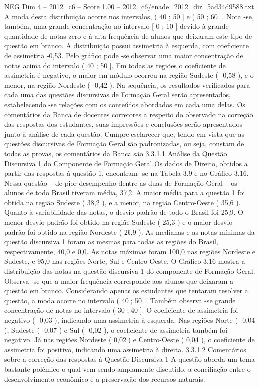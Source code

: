 \begin{textsample}{NEG Dim 4 – 2012\_c6 – Score 1.00 – 2012\_c6/enade\_2012\_dir\_5ad34d9588.txt}
A moda desta distribuição ocorre nos intervalos, ( 40 ; 50 ] e ( 50 ; 60 ].
Nota -se, também, uma grande concentração no intervalo [ 0 ; 10 ] devido à grande quantidade de notas zero e à alta frequência de alunos que deixaram este tipo de questão em branco.
A distribuição possui assimetria à esquerda, com coeficiente de assimetria -0,53.
Pelo gráfico pode -se observar uma maior concentração de notas acima do intervalo ( 40 ; 50 ].
Em todas as regiões o coeficiente de assimetria é negativo, o maior em módulo ocorreu na região Sudeste ( -0,58 ), e o menor, na região Nordeste ( -0,42 ).
Na sequência, os resultados verificados para cada uma das questões discursivas de Formação Geral serão apresentados, estabelecendo -se relações com os conteúdos abordados em cada uma delas.
Os comentários da Banca de docentes corretores a respeito do observado na correção das respostas dos estudantes, suas impressões e conclusões serão apresentados junto à análise de cada questão.
Cumpre esclarecer que, tendo em vista que as questões discursivas de Formação Geral são padronizadas, ou seja, constam de todas as provas, os comentários da Banca são 3.3.1.1 Análise da Questão Discursiva 1 do Componente de Formação Geral Os dados de Direito, obtidos a partir das respostas à questão 1, encontram -se na Tabela 3.9 e no Gráfico 3.16.
Nessa questão – de pior desempenho dentre as duas de Formação Geral – os alunos de todo Brasil tiveram média, 37,2.
A maior média para a questão 1 foi obtida na região Sudeste ( 38,2 ), e a menor, na região Centro-Oeste ( 35,6 ).
Quanto à variabilidade das notas, o desvio padrão de todo o Brasil foi 25,9.
O menor desvio padrão foi obtido na região Sudeste ( 25,3 ) e o maior desvio padrão foi obtido na região Nordeste ( 26,9 ).
As medianas e as notas mínimas da questão discursiva 1 foram as mesmas para todas as regiões do Brasil, respectivamente, 40,0 e 0,0.
As notas máximas foram 100,0 nas regiões Nordeste e Sudeste, e 95,0 nas regiões Norte, Sul e Centro-Oeste.
O Gráfico 3.16 mostra a distribuição das notas na questão discursiva 1 do componente de Formação Geral.
Observa -se que a maior frequência corresponde aos alunos que deixaram a questão em branco.
Considerando apenas os estudantes que tentaram resolver a questão, a moda ocorre no intervalo ( 40 ; 50 ].
Também observa -se grande concentração de notas no intervalo ( 30 ; 40 ].
O coeficiente de assimetria foi negativo ( -0,03 ), indicando uma assimetria à esquerda.
Nas regiões Norte ( -0,04 ), Sudeste ( -0,07 ) e Sul ( -0,02 ), o coeficiente de assimetria também foi negativo.
Já nas regiões Nordeste ( 0,02 ) e Centro-Oeste ( 0,04 ), o coeficiente de assimetria foi positivo, indicando uma assimetria à direita. 3.3.1.2 Comentários sobre a correção das respostas à Questão Discursiva 1 A questão aborda um tema bastante polêmico o qual vem sendo amplamente discutido, a conciliação entre o desenvolvimento econômico e a preservação dos recursos naturais.

\end{textsample}
